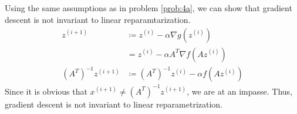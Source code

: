 \documentclass[11pt,a4paper,titlepage]{article}
\begin{document}
{\subsection{}{
Using the same assumptions as in problem \ref{prob:4a}, we can show that gradient descent is not invariant to linear reparamtarization.
\begin{align*}
	z^{(i+1)} &\coloneqq z^{(i)} - \alpha \nabla g(z^{(i)})
    \\&= z^{(i)} - \alpha A^T \nabla f(Az^{(i)})
  \\(A^T)^{-1}z^{(i+1)} &\coloneqq (A^T)^{-1} z^{(i)} - \alpha f(Az^{(i)})
\end{align*}
Since it is obvious that $x^{(i+1)} \neq (A^T)^{-1}z^{(i+1)}$, we are at an impasse. Thus, gradient descent is not invariant to linear reparametrization.
}\label{prob:4b}
}\label{problem 4}
\end{document}
